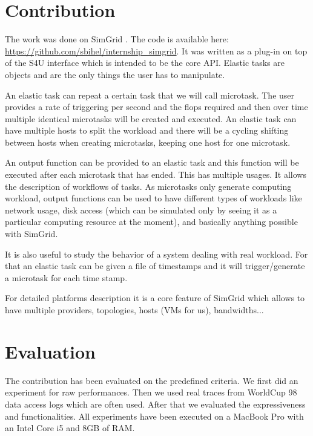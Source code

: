 \documentclass[a4paper]{IEEEtran}
\begin{document}
\section{Contribution} \label{contrib}
  The work was done on SimGrid \cite{casanova:hal-01017319}. The code is
  available here: \url{https://github.com/sbihel/internship_simgrid}. It was
  written as a plug-in on top of the S4U interface which is intended to be the
  core API. Elastic tasks are objects and are the only things the user has to
  manipulate.
  
  An elastic task can repeat a certain task that we will call microtask. The 
  user provides a rate of triggering per second and the flops required and then 
  over time multiple identical microtasks will be created and executed. An 
  elastic task can have multiple hosts to split the workload and there will be 
  a cycling shifting between hosts when creating microtasks, keeping one host 
  for one microtask.
  
  An output function can be provided to an elastic task and this function will 
  be executed after each microtask that has ended. This has multiple usages. It 
  allows the description of workflows of tasks. As microtasks only generate 
  computing workload, output functions can be used to have different types of 
  workloads like network usage, disk access (which can be simulated only by 
  seeing it as a particular computing resource at the moment), and basically 
  anything possible with SimGrid.
  
  It is also useful to study the behavior of a system dealing with real 
  workload. For that an elastic task can be given a file of timestamps and it 
  will trigger/generate a microtask for each time stamp.
  
  For detailed platforms description it is a core feature of SimGrid which 
  allows to have multiple providers, topologies, hosts (VMs for us), 
  bandwidths...


\section{Evaluation} \label{eval}
  The contribution has been evaluated on the predefined criteria. We first did 
  an experiment for raw performances. Then we used real traces from WorldCup 98 
  data access logs \cite{wc98} which are often used. After that we evaluated 
  the expressiveness and functionalities. All experiments have been executed on 
  a MacBook Pro with an Intel Core i5 and 8GB of RAM.
    
\end{document}
